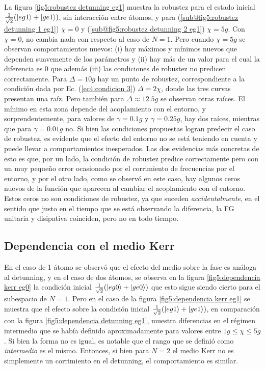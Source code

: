 La figura \ref{fig5:robustez detunning eg1} muestra la robustez para el estado inicial $\frac{1}{\sqrt{2}}(\ket{eg1}+\ket{ge1})$, sin interacción entre átomos, y para (\ref{sub@fig5:robustez detunning 1 eg1}) $\chi=0$ y (\ref{sub@fig5:robustez detunning 2 eg1}) $\chi=5g$. Con $\chi=0$, no cambia nada con respecto al caso de $N=1$. Pero cuando $\chi=5g$ se observan comportamientos nuevos: (i) hay máximos y mínimos nuevos que dependen suavemente de los parámetros y (ii) hay más de un valor para el cual la diferencia es 0 que además (iii) las condiciones de robustez no predicen correctamente. Para $\Delta=10g$ hay un punto de robustez, correspondiente a la condición dada por Ec. (\ref{ec4:condicion 3}) $\Delta=2\chi$, donde las tres curvas presentan una raíz. Pero también para $\Delta \approx 12.5g$ se observan otras raíces. El mínimo en esta zona depende del acoplamiento con el entorno, y sorprendentemente, para valores de $\gamma=0.1g$ y $\gamma=0.25g$, hay dos raíces, mientras que para $\gamma=0.01g$ no. Si bien las condiciones propuestas logran predecir el caso de robustez, es evidente que el efecto del entorno no se está teniendo en cuenta y puede llevar a comportamientos inesperados. Las dos evidencias más concretas de esto es que, por un lado, la condición de robustez predice correctamente pero con un muy pequeño error ocasionado por el corrimiento de frecuencias por el entorno, y por el otro lado, como se observó en este caso, hay algunos ceros nuevos de la función que aparecen al cambiar el acoplamiento con el entorno. Estos ceros no son condiciones de robustez, ya que suceden \textit{accidentalmente}, en el sentido que justo en el tiempo que se está observando la diferencia, la FG unitaria y disipativa coinciden, pero no en todo tiempo.


\subsection{Dependencia con el medio Kerr}

En el caso de 1 átomo se observó que el efecto del medio sobre la fase es análoga al detunning, y en el caso de dos átomos, se observa en la figura \ref{fig5:dependencia kerr eg0} la condición inicial $\frac{1}{\sqrt{2}}(\ket{eg0}+\ket{ge0})$ que esto sigue siendo cierto para el subespacio de $N=1$. Pero en el caso de la figura \ref{fig5:dependencia kerr eg1} se muestra que el efecto sobre la condición inicial $\frac{1}{\sqrt{2}}(\ket{eg1}+\ket{ge1})$, en comparación con la figura \ref{fig5:dependencia detunning eg1}, muestra diferencias en el régimen intermedio que se había definido aproximadamente para valores entre $1g \leq \chi \leq 5g$. Si bien la forma no es igual, es notable que el rango que se definió como \textit{intermedio} es el mismo. Entonces, si bien para $N=2$ el medio Kerr no es simplemente un corrimiento en el detunning, el comportamiento es similar. 

